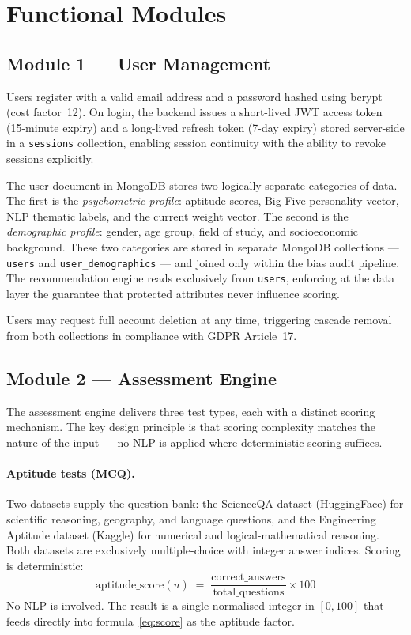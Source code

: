 \section{Functional Modules}
\label{sec:modules}

\subsection*{Module 1 --- User Management}

Users register with a valid email address and a password hashed using bcrypt
(cost factor~12). On login, the backend issues a short-lived JWT access token
(15-minute expiry) and a long-lived refresh token (7-day expiry) stored
server-side in a \texttt{sessions} collection, enabling session continuity
with the ability to revoke sessions explicitly.

The user document in MongoDB stores two logically separate categories of data.
The first is the \emph{psychometric profile}: aptitude scores, Big Five
personality vector, NLP thematic labels, and the current weight vector. The
second is the \emph{demographic profile}: gender, age group, field of study,
and socioeconomic background. These two categories are stored in separate
MongoDB collections --- \texttt{users} and \texttt{user\_demographics} --- and
joined only within the bias audit pipeline. The recommendation engine reads
exclusively from \texttt{users}, enforcing at the data layer the guarantee that
protected attributes never influence scoring.

Users may request full account deletion at any time, triggering cascade removal
from both collections in compliance with GDPR Article~17.

\subsection*{Module 2 --- Assessment Engine}

The assessment engine delivers three test types, each with a distinct scoring
mechanism. The key design principle is that scoring complexity matches the
nature of the input --- no NLP is applied where deterministic scoring suffices.

\paragraph{Aptitude tests (MCQ).}
Two datasets supply the question bank: the ScienceQA dataset (HuggingFace) for
scientific reasoning, geography, and language questions, and the Engineering
Aptitude dataset (Kaggle) for numerical and logical-mathematical reasoning.
Both datasets are exclusively multiple-choice with integer answer indices.
Scoring is deterministic:
%
\begin{equation}
  \text{aptitude\_score}(u)
  \;=\;
  \frac{\text{correct\_answers}}{\text{total\_questions}} \times 100
  \label{eq:aptitude}
\end{equation}
%
No NLP is involved. The result is a single normalised integer in $[0, 100]$
that feeds directly into formula~\eqref{eq:score} as the aptitude factor.

